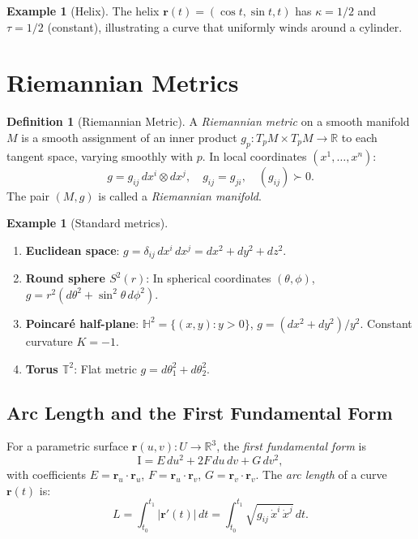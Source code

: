 \documentclass[12pt,a4paper]{amsart}
\theoremstyle{definition}
\newtheorem{definition}[theorem]{Definition}
\newtheorem{example}[theorem]{Example}
\begin{document}
\begin{example}[Helix]
The helix $\mathbf{r}(t) = (\cos t, \sin t, t)$ has
$\kappa = 1/2$ and $\tau = 1/2$ (constant), illustrating a curve that
uniformly winds around a cylinder.
\end{example}

\section{Riemannian Metrics}
\label{sec:metrics}

\begin{definition}[Riemannian Metric]
A \emph{Riemannian metric} on a smooth manifold $M$ is a smooth assignment
of an inner product $g_p: T_pM \times T_pM \to \mathbb{R}$ to each tangent
space, varying smoothly with $p$. In local coordinates $(x^1, \ldots, x^n)$:
\[
  g = g_{ij}\,dx^i \otimes dx^j, \quad g_{ij} = g_{ji}, \quad (g_{ij}) \succ 0.
\]
The pair $(M, g)$ is called a \emph{Riemannian manifold}.
\end{definition}

\begin{example}[Standard metrics]
\begin{enumerate}[label=(\alph*)]
  \item \textbf{Euclidean space}: $g = \delta_{ij}\,dx^i\,dx^j = dx^2 + dy^2 + dz^2$.
  \item \textbf{Round sphere $S^2(r)$}: In spherical coordinates
        $(\theta, \phi)$, $g = r^2(d\theta^2 + \sin^2\!\theta\,d\phi^2)$.
  \item \textbf{Poincar\'e half-plane}: $\mathbb{H}^2 = \{(x,y): y>0\}$,
        $g = (dx^2 + dy^2)/y^2$. Constant curvature $K = -1$.
  \item \textbf{Torus $\mathbb{T}^2$}: Flat metric
        $g = d\theta_1^2 + d\theta_2^2$.
\end{enumerate}
\end{example}

\subsection{Arc Length and the First Fundamental Form}

For a parametric surface $\mathbf{r}(u,v): U \to \mathbb{R}^3$, the
\emph{first fundamental form} is
\[
  \mathrm{I} = E\,du^2 + 2F\,du\,dv + G\,dv^2,
\]
with coefficients $E = \mathbf{r}_u \cdot \mathbf{r}_u$,
$F = \mathbf{r}_u \cdot \mathbf{r}_v$, $G = \mathbf{r}_v \cdot \mathbf{r}_v$.
The \emph{arc length} of a curve $\mathbf{r}(t)$ is:
\[
  L = \int_{t_0}^{t_1} |\mathbf{r}'(t)|\,dt
    = \int_{t_0}^{t_1} \sqrt{g_{ij}\,\dot{x}^i\,\dot{x}^j}\,dt.
\]
\end{document}
